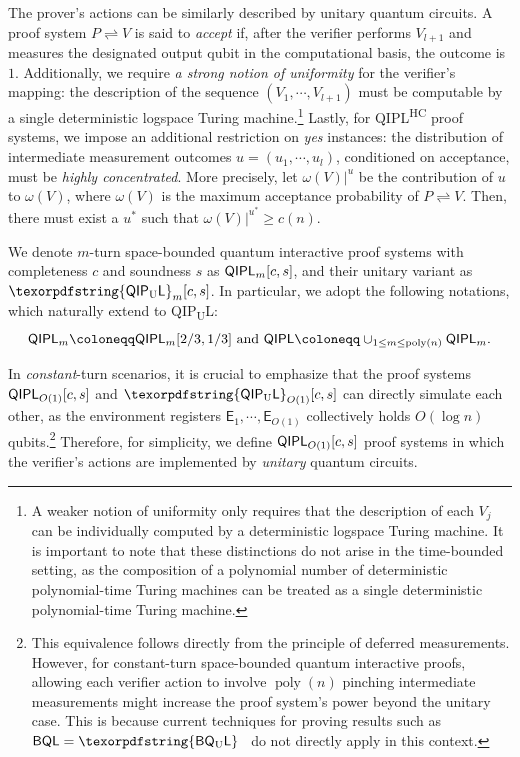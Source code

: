 \documentclass[10pt,a4paper]{article}
\numberwithin{equation}{section}
\numberwithin{figure}{section}
\newcommand{\QIPL}{\textnormal{\textsf{QIPL}}\xspace}
\newcommand{\QIPUL}{\texorpdfstring{\textnormal{\textsf{QIP}\textsubscript{\textnormal{U}}\textsf{L}}}\xspace}
\newcommand{\QIPLHC}{\texorpdfstring{\textnormal{\textsf{QIPL}\textsuperscript{\textnormal{HC}}}}\xspace}
\newcommand{\protocol}[2]{{#1}\!\rightleftharpoons\!{#2}}
\newcommand{\BQL}{\textnormal{\textsf{BQL}}\xspace}
\newcommand{\BQUL}{\texorpdfstring{\textnormal{\textsf{BQ}\textsubscript{U}\textsf{L}}}\xspace}
\DeclareMathOperator\poly{poly}
\newcommand{\sfE}{\mathsf{E}}
\begin{document}
The prover's actions can be similarly described by unitary quantum circuits. A proof system $\protocol{P}{V}$ is said to \textit{accept} if, after the verifier performs $V_{l+1}$ and measures the designated output qubit in the computational basis, the outcome is $1$. 
Additionally, we require \textit{a strong notion of uniformity} for the verifier's mapping: the description of the sequence $(V_1,\cdots,V_{l+1})$ must be computable by a single deterministic logspace Turing machine.\footnote{A weaker notion of uniformity only requires that the description of each $V_j$ can be individually computed by a deterministic logspace Turing machine. It is important to note that these distinctions do not arise in the time-bounded setting, as the composition of a polynomial number of deterministic polynomial-time Turing machines can be treated as a single deterministic polynomial-time Turing machine.} 
Lastly, for \QIPLHC{} proof systems, we impose an additional restriction on \textit{yes} instances: the distribution of intermediate measurement outcomes $u = (u_1,\cdots,u_l)$, conditioned on acceptance, must be \textit{highly concentrated}. More precisely, let $\omega(V)|^u$ be the contribution of $u$ to $\omega(V)$, where $\omega(V)$ is the maximum acceptance probability of $\protocol{P}{V}$. Then, there must exist a $u^*$ such that $\omega(V)|^{u^*} \geq c(n)$.

We denote $m$-turn space-bounded quantum interactive proof systems with completeness $c$ and soundness $s$ as $\QIPL_m[c,s]$, and their unitary variant as $\QIPUL_m[c,s]$. 
In particular, we adopt the following notations, which naturally extend to \QIPUL{}: 
\[ \QIPL_m \coloneqq \QIPL_m[2/3,1/3] \text{ and } \QIPL \coloneqq \cup_{1 \leq m \leq \poly(n)} \QIPL_m.\]

In \textit{constant}-turn scenarios, it is crucial to emphasize that the proof systems $\QIPL_{O(1)}[c,s]$ and $\QIPUL_{O(1)}[c,s]$ can directly simulate each other, as the environment registers $\sfE_1,\cdots,\sfE_{O(1)}$ collectively holds $O(\log{n})$ qubits.\footnote{This equivalence follows directly from the principle of deferred measurements. However, for constant-turn space-bounded quantum interactive proofs, allowing each verifier action to involve $\poly(n)$ pinching intermediate measurements might increase the proof system's power beyond the unitary case. This is because current techniques for proving results such as $\BQL = \BQUL$~\cite{FR21,GRZ21,GR22} do not directly apply in this context.\label{footref:constant-turn-QIPL}} Therefore, for simplicity, we define $\QIPL_{O(1)}[c,s]$ proof systems in which the verifier's actions are implemented by \textit{unitary} quantum circuits. 
\end{document}
